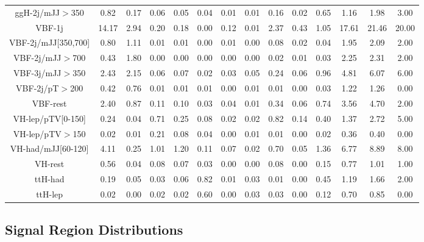 \begin{table}[htb]
\begin{center}
{\begin{tabular}{cccccccc|ccc|cc|c}
				ggH-2j/mJJ$>$350     &0.82   &0.17  &0.06  &0.05  &0.04  &0.01  &0.01  &0.16   &0.02  &0.65    &1.16   &1.98    &3.00    \\
				VBF-1j               &14.17  &2.94  &0.20  &0.18  &0.00  &0.12  &0.01  &2.37   &0.43  &1.05    &17.61  &21.46   &20.00   \\
				VBF-2j/mJJ[350,700]  &0.80   &1.11  &0.01  &0.01  &0.00  &0.01  &0.00  &0.08   &0.02  &0.04    &1.95   &2.09    &2.00    \\
				VBF-2j/mJJ$>$700     &0.43   &1.80  &0.00  &0.00  &0.00  &0.00  &0.00  &0.02   &0.01  &0.03    &2.25   &2.31    &2.00    \\
				VBF-3j/mJJ$>$350     &2.43   &2.15  &0.06  &0.07  &0.02  &0.03  &0.05  &0.24   &0.06  &0.96    &4.81   &6.07    &6.00    \\
				VBF-2j/pT$>$200      &0.42   &0.76  &0.01  &0.01  &0.01  &0.00  &0.01  &0.01   &0.00  &0.03    &1.22   &1.26    &0.00    \\
				VBF-rest             &2.40   &0.87  &0.11  &0.10  &0.03  &0.04  &0.01  &0.34   &0.06  &0.74    &3.56   &4.70    &2.00    \\
				VH-lep/pTV[0-150]    &0.24   &0.04  &0.71  &0.25  &0.08  &0.02  &0.02  &0.82   &0.14  &0.40    &1.37   &2.72    &5.00    \\
				VH-lep/pTV$>$150     &0.02   &0.01  &0.21  &0.08  &0.04  &0.00  &0.01  &0.01   &0.00  &0.02    &0.36   &0.40    &0.00    \\
				VH-had/mJJ[60-120]   &4.11   &0.25  &1.01  &1.20  &0.11  &0.07  &0.02  &0.70   &0.05  &1.36    &6.77   &8.89    &8.00    \\
				VH-rest              &0.56   &0.04  &0.08  &0.07  &0.03  &0.00  &0.00  &0.08   &0.00  &0.15    &0.77   &1.01    &1.00    \\
				ttH-had              &0.19   &0.05  &0.03  &0.06  &0.82  &0.01  &0.03  &0.01   &0.00  &0.45    &1.19   &1.66    &2.00    \\
				ttH-lep              &0.02   &0.00  &0.02  &0.02  &0.60  &0.00  &0.03  &0.03   &0.00  &0.12    &0.70   &0.85    &0.00    \\
				\hline
				\hline
		\end{tabular}}
	\end{center}
\end{table}

\subsection{Signal Region Distributions}

